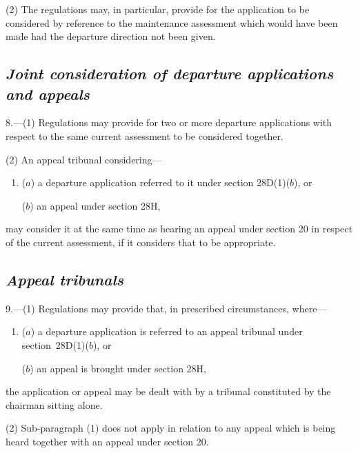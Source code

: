 \documentclass[12pt,a4paper]{article}
\begin{document}
(2) The regulations may, in particular, provide for the application to be considered by reference to the maintenance assessment which would have been made had the departure direction not been given.

\subsection*{\itshape Joint consideration of departure applications and appeals}

8.---(1) Regulations may provide for two or more departure applications with respect to the same current assessment to be considered together.

(2) 
An appeal tribunal  %
considering—
\begin{enumerate}\item[]
($a$) a departure application referred to it under section 28D(1)($b$), or

($b$) an appeal under section 28H,
\end{enumerate}
may consider it at the same time as hearing an appeal under section 20 in respect of the current assessment, if it considers that to be appropriate.


\subsection*{\itshape 
Appeal tribunals  %
}

9.---(1) Regulations may provide that, in prescribed circumstances, where—
\begin{enumerate}\item[]
($a$) a departure application is referred to 
an appeal tribunal  %
under section~28D(1)($b$), or

($b$) an appeal is brought under section 28H,
\end{enumerate}
the application or appeal may be dealt with by a tribunal constituted by the chairman sitting alone.

(2) Sub-paragraph (1) does not apply in relation to any appeal which is being heard together with an appeal under section 20.
\end{document}
